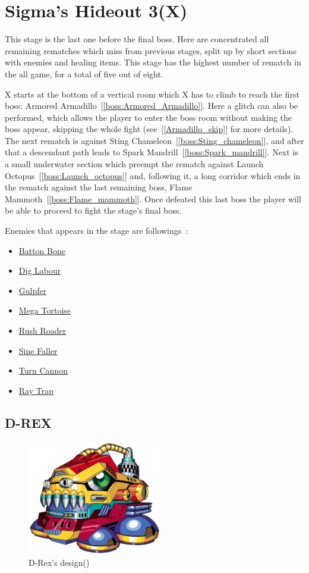 \section{Sigma's Hideout 3(X)}
This stage is the last one before the final boss. Here are concentrated all remaining rematches which miss from previous stages, split up by short sections with enemies and healing items. This stage has the highest number of rematch in the all game, for a total of five out of eight.

X starts at the bottom of a vertical room which X has to climb to reach the first boss: Armored Armadillo~[\ref{boss:Armored_Armadillo}]. Here a glitch can also be performed, which allows the player to enter the boss room without making the boss appear, skipping the whole fight (see~[\ref{Armadillo_skip}] for more details). The next rematch is against Sting Chameleon~[\ref{boss:Sting_chameleon}], and after that a descendant path leads to Spark Mandrill~[\ref{boss:Spark_mandrill}]. Next is a small underwater section which preempt the rematch against Launch Octopus~[\ref{boss:Launch_octopus}] and, following it, a long corridor which ends in the rematch against the last remaining boss, Flame Mammoth~[\ref{boss:Flame_mammoth}]. Once defeated this last boss the player will be able to proceed to fight the stage's final boss.

Enemies that appears in the stage are followings~\cite{wiki:sigma_stages}:

\begin{itemize}
	\item \hyperlink{enem:Batton_Bone}{Batton Bone}
	\item \hyperlink{enem:Dig_Labour}{Dig Labour}
	\item \hyperlink{enem:Gulpfer}{Gulpfer}
	\item \hyperlink{enem:Mega_Tortoise}{Mega Tortoise}
	\item \hyperlink{enem:Rush_Roader}{Rush Roader}
	\item \hyperlink{enem:Sine_Faller}{Sine Faller}
	\item \hyperlink{enem:Turn_Cannon}{Turn Cannon}
	\item \hyperlink{enem:Ray_Trap}{Ray Trap}
\end{itemize} 

\subsection{D-REX}
\begin{figure}[htp]
	\centering
	\includegraphics[height=5cm]{figures/X1/Sigma_stages/Drex.jpg}
	\caption{D-Rex's design(\cite{book:MMX_Complete_art})}
\end{figure}



